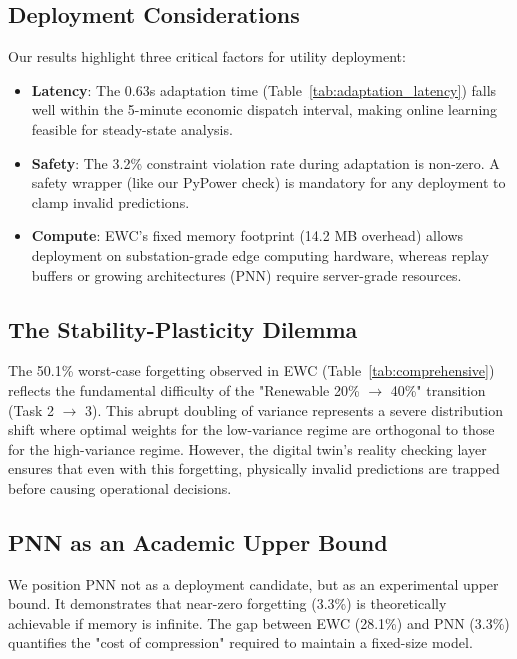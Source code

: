 \documentclass[journal,12pt,onecolumn]{IEEEtran}
\begin{document}
\subsection{Deployment Considerations}

Our results highlight three critical factors for utility deployment:

\begin{itemize}
    \item \textbf{Latency}: The 0.63s adaptation time (Table~\ref{tab:adaptation_latency}) falls well within the 5-minute economic dispatch interval, making online learning feasible for steady-state analysis.
    
    \item \textbf{Safety}: The 3.2\% constraint violation rate during adaptation is non-zero. A safety wrapper (like our PyPower check) is mandatory for any deployment to clamp invalid predictions.
    
    \item \textbf{Compute}: EWC's fixed memory footprint (14.2 MB overhead) allows deployment on substation-grade edge computing hardware, whereas replay buffers or growing architectures (PNN) require server-grade resources.
\end{itemize}

\subsection{The Stability-Plasticity Dilemma}

The 50.1\% worst-case forgetting observed in EWC (Table~\ref{tab:comprehensive}) reflects the fundamental difficulty of the "Renewable 20\% $\to$ 40\%" transition (Task 2 $\to$ 3). This abrupt doubling of variance represents a severe distribution shift where optimal weights for the low-variance regime are orthogonal to those for the high-variance regime. However, the digital twin's reality checking layer ensures that even with this forgetting, physically invalid predictions are trapped before causing operational decisions.

\subsection{PNN as an Academic Upper Bound}

We position PNN not as a deployment candidate, but as an experimental upper bound. It demonstrates that near-zero forgetting (3.3\%) is theoretically achievable if memory is infinite. The gap between EWC (28.1\%) and PNN (3.3\%) quantifies the "cost of compression" required to maintain a fixed-size model.
\end{document}
